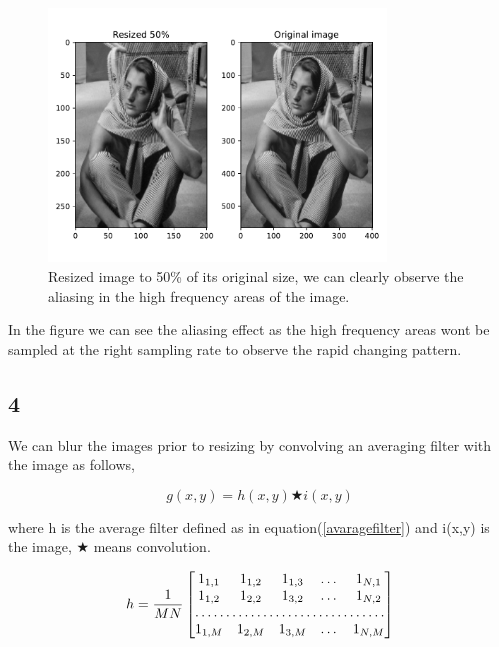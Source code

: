 {\begin{figure}[!htb]
    {\centering
        \includegraphics[width=0.80\textwidth]{resized.pdf}
        \caption{Resized image to 50\% of its original size, we can clearly observe the aliasing in the high frequency areas of the image.}
        \label{resized}
    \par}
    \end{figure}

In the figure we can see the aliasing effect as the high frequency areas wont be sampled at the right sampling rate to observe the rapid changing pattern.

\subsection{4}

We can blur the images prior to resizing by convolving an averaging filter with the image as follows,
\begin{figure}[!htb]
\begin{equation}
    g(x,y) = h(x,y) \bigstar i(x,y)
\end{equation}
\end{figure}

where h is the average filter defined as in equation(\ref{avaragefilter}) and i(x,y) is the image, $\bigstar$ means convolution. 

\begin{figure}[!htb]
\begin{equation}
    h = \frac{1}{MN}\begin{bmatrix}
        1_{1,1}       & 1_{1,2} & 1_{1,3} & \dots & 1_{N,1} \\
        1_{1,2}       & 1_{2,2} & 1_{3,2} & \dots & 1_{N,2} \\
        \hdotsfor{5} \\
        1_{1,M}       & 1_{2,M} & 1_{3,M} & \dots & 1_{N,M}
    \end{bmatrix}
    \label{avaragefilter}
\end{equation}
\end{figure}

}
